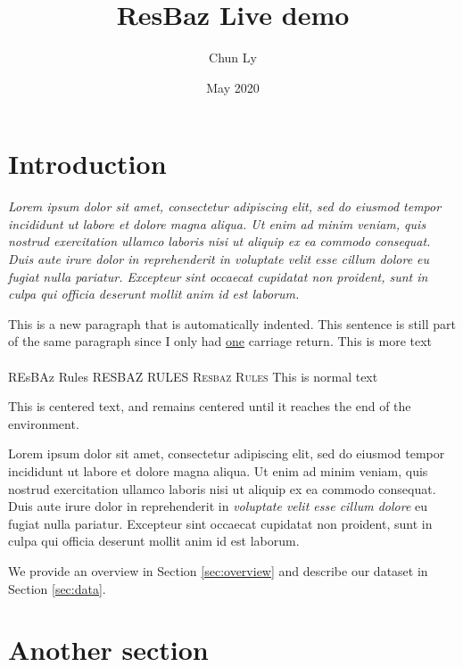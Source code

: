 \documentclass[12pt]{article}
\title{ResBaz Live demo}
\author{Chun Ly}
\date{May 2020}
\begin{document}
\maketitle

\section{Introduction}

\textit{Lorem ipsum dolor sit amet, consectetur adipiscing elit, sed do eiusmod tempor incididunt ut labore et dolore magna aliqua. Ut enim ad minim veniam, quis nostrud exercitation ullamco laboris nisi ut aliquip ex ea commodo consequat. Duis aute irure dolor in reprehenderit in \emph{voluptate velit esse cillum dolore} eu fugiat nulla pariatur. Excepteur sint occaecat cupidatat non proident, sunt in culpa qui officia deserunt mollit anim id est laborum.}

\noindent This is a new paragraph that is automatically indented.
This sentence is still part of the same paragraph since I only had \underline{one} carriage return.
This is more text\\~\\
{\Large REsBAz Rules}
\large{RESBAZ RULES}
\textsc{Resbaz Rules}
\textsf{This is normal text}

\begin{flushright}
    This is centered text, and remains centered until it reaches the end of the environment.
    
    Lorem ipsum dolor sit amet, consectetur adipiscing elit, sed do eiusmod tempor incididunt ut labore et dolore magna aliqua. Ut enim ad minim veniam, quis nostrud exercitation ullamco laboris nisi ut aliquip ex ea commodo consequat. Duis aute irure dolor in reprehenderit in \emph{voluptate velit esse cillum dolore} eu fugiat nulla pariatur. Excepteur sint occaecat cupidatat non proident, sunt in culpa qui officia deserunt mollit anim id est laborum.
\end{flushright}


We provide an overview in Section \ref{sec:overview} and describe our dataset in
Section \ref{sec:data}.

\section{Another section}

\newpage
\end{document}
